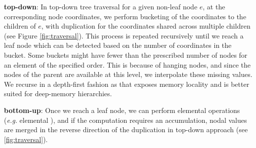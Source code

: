 \textbf{top-down}: In top-down tree traversal for a given non-leaf node $e$, at the corresponding node coordinates, we perform bucketing of the coordinates to the children of $e$, with duplication for the coordinates shared across multiple children (see Figure \ref{fig:traversal}). This process is repeated recursively until we reach a leaf node which can be detected based on the number of coordinates in the bucket. Some buckets might have fewer than the prescribed number of nodes for an element of the specified order. This is because of hanging nodes, and since the nodes of the parent are available at this level, we interpolate these missing values. We recurse in a depth-first fashion as that exposes memory locality and is better suited for deep-memory hierarchies. %

\textbf{bottom-up}: Once we reach a leaf node, we can perform elemental operations ({\em e.g.} elemental \mvec), and if the computation requires an accumulation, nodal values are merged in the reverse direction of the duplication in top-down approach (see \ref{fig:traversal}). 

